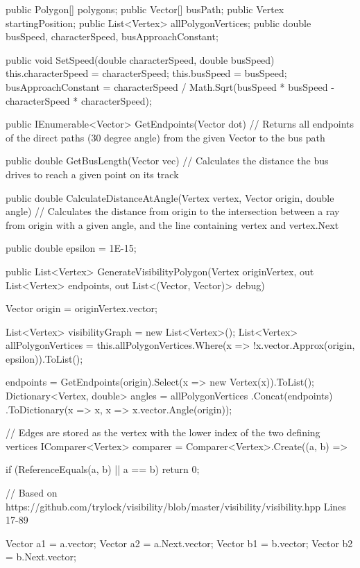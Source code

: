 \documentclass[12pt]{article}
\begin{document}
\begin{Csharp}[caption=class Map]
\begin{Csharp}
public Polygon[] polygons;
public Vector[] busPath;
public Vertex startingPosition;
public List<Vertex> allPolygonVertices;
public double busSpeed, characterSpeed, busApproachConstant;

public void SetSpeed(double characterSpeed, double busSpeed)
{
    this.characterSpeed = characterSpeed;
    this.busSpeed = busSpeed;
    busApproachConstant = characterSpeed / Math.Sqrt(busSpeed * busSpeed - characterSpeed * characterSpeed);
}

public IEnumerable<Vector> GetEndpoints(Vector dot)
// Returns all endpoints of the direct paths (30 degree angle) from the given Vector to the bus path

public double GetBusLength(Vector vec)
// Calculates the distance the bus drives to reach a given point on its track

public double CalculateDistanceAtAngle(Vertex vertex, Vector origin, double angle)
// Calculates the distance from origin to the intersection between a ray from origin with a given angle, and the line containing vertex and vertex.Next

public double epsilon = 1E-15;

public List<Vertex> GenerateVisibilityPolygon(Vertex originVertex, out List<Vertex> endpoints, out List<(Vector, Vector)> debug)
{
    Vector origin = originVertex.vector;

    List<Vertex> visibilityGraph = new List<Vertex>();
    List<Vertex> allPolygonVertices = this.allPolygonVertices.Where(x => !x.vector.Approx(origin, epsilon)).ToList();

    endpoints = GetEndpoints(origin).Select(x => new Vertex(x)).ToList();
    Dictionary<Vertex, double> angles =
        allPolygonVertices
        .Concat(endpoints)
        .ToDictionary(x => x, x => x.vector.Angle(origin));

    // Edges are stored as the vertex with the lower index of the two defining vertices
    IComparer<Vertex> comparer = Comparer<Vertex>.Create((a, b) =>
    {
        if (ReferenceEquals(a, b) || a == b) return 0;

        // Based on https://github.com/trylock/visibility/blob/master/visibility/visibility.hpp Lines 17-89

        Vector a1 = a.vector;
        Vector a2 = a.Next.vector;
        Vector b1 = b.vector;
        Vector b2 = b.Next.vector;

}}
\end{Csharp}
\end{Csharp}
\end{document}
